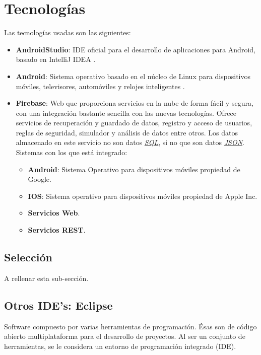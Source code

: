 \section{Tecnologías}
	Las tecnologías usadas son las siguientes:
	\begin{itemize}
		\item {\bf AndroidStudio}\cite{1:androidstudio:online}: IDE\cite{12:ide:online} oficial para el desarrollo de aplicaciones para Android, basado en IntelliJ IDEA \cite{3:intellij:online}.
		\item {\bf Android}\cite{2:android:online}: Sistema operativo basado en el núcleo de Linux \cite{4:nucleolinux:online} para dispositivos móviles, televisores, automóviles y relojes inteligentes \cite{5:wearables:online}.
		\item {\bf Firebase}\cite{6:firebase:online}: Web que proporciona servicios en la nube de forma fácil y segura, con una integración bastante sencilla con las nuevas tecnologías. Ofrece servicios de recuperación y guardado de datos, registro y acceso de usuarios, reglas de seguridad, simulador y análisis de datos entre otros. Los datos almacenado en este servicio no son datos \href{http://es.wikipedia.org/wiki/SQL}{\textit{SQL}}\cite{8:jquery:online}\cite{9:jquery:online}, si no que son datos \href{http://es.wikipedia.org/wiki/JSON}{\textit{JSON}}\cite{7:json:online}. Sistemas con los que está integrado:
		\begin{itemize}
			\item {\bf Android}\cite{2:android:online}: Sistema Operativo para dispositivos móviles propiedad de Google.
			\item {\bf IOS}\cite{10:ios:online}: Sistema operativo para dispositivos móviles propiedad de Apple Inc.
			\item {\bf Servicios Web}.
			\item {\bf Servicios REST}\cite{11:rest:online}.
		\end{itemize}
	\end{itemize}
	
	\subsection{Selección}
	A rellenar esta sub-sección.
	
	\subsection{Otros IDE's: Eclipse\cite{19:eclipse:online}}
	Software compuesto por varias herramientas de programación. Ésas son de código abierto multiplataforma para el desarrollo de proyectos. Al ser un conjunto de herramientas, se le considera un entorno de programación integrado (IDE)\cite{12:ide:online}.
	
